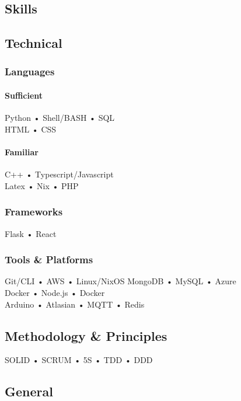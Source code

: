 \documentclass[11pt, twoside, a4paper, titlepage]{article}
\begin{document}
\begin{tcolorbox}[boxsep=0mm, left=0mm, right=0mm, top=0mm, bottom=0mm, height=23.5cm]
	\begin{minipage}[t]{6.01cm}
		\begin{tcolorbox}[colframe=black, colback=black, arc=0mm, sharp corners, fontupper=\color{white}, height=23.4cm]
			\section{Skills}
			
			\subsection{Technical}
			\subsubsection{Languages}
			\paragraph{Sufficient}
			\small
			\parbox{5cm}{Python • Shell/BASH • SQL \\ HTML • CSS }
			\paragraph{Familiar}
			\parbox{5cm}{C++ • Typescript/Javascript \\ Latex • Nix • PHP }
			\subsubsection{Frameworks}
			\parbox{5cm}{Flask • React}
			\subsubsection{Tools \& Platforms}
			\parbox{5cm}{Git/CLI • AWS • Linux/NixOS  MongoDB • MySQL • Azure \\ Docker • Node.js • Docker \\ Arduino • Atlasian • MQTT • Redis }
			
			\subsection{Methodology \& Principles}
			\parbox{5cm}{SOLID • SCRUM • 5S • TDD • DDD}
			
			\subsection{General}
			

\end{tcolorbox}
\end{minipage}
\end{tcolorbox}
\end{document}
